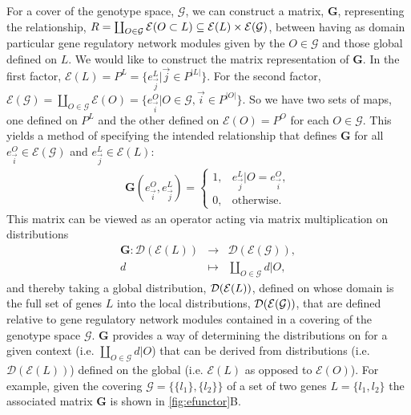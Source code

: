 For a cover of the genotype space, $\mathcal{G}$, we can construct a matrix, $\mathbf{G}$, representing the relationship, $R = \coprod_{O \in \mathcal{G}} \mathcal{E}(O \subset L) \subseteq \mathcal{E}(L) \times \mathcal{E} (\mathcal{G})$, between \gnpm{} having as domain particular gene regulatory network modules given by the $O \in \mathcal{G}$ and those global \gnpm{} defined on $L$. We would like to construct the matrix representation of $\mathbf{G}$. In the first factor, $\mathcal{E}(L) = P^L = \{e^{L}_{\vec{j}} | \vec{j} \in P^{|L|}\}$.
For the second factor, $ \mathcal{E}(\mathcal{G}) = \coprod_{O \in \mathcal{G}} \mathcal{E}(O) = \{e^O_{\vec{i}} | O \in \mathcal{G}, \vec{i} \in P^{|O|} \}$.
 So we have two sets of maps, one defined on $P^L$ and the other defined on $\mathcal{E}(O) = P^O$ for each $O \in \mathcal{G}$. This yields a method of specifying the intended relationship that defines $\mathbf{G}$ for all $e^O_{\vec{i}} \in \mathcal{E}(\mathcal{G})$ and $e^{L}_{\vec{j}} \in \mathcal{E}(L)$:
\begin{eqnarray}\label{eq:margmat}
\mathbf{G}(e^O_{\vec{i}},e^L_{\vec{j}}) =
\begin{cases}
1, & e^L_{\vec{j}}|O = e^O_{\vec{i}},\\
0, & \text{otherwise}.
\end{cases}
\end{eqnarray}
This matrix can be viewed as an operator acting via matrix multiplication on distributions
\begin{eqnarray*}
\mathbf{G} \colon \mathcal{D}(\mathcal{E}(L)) &\rightarrow& \mathcal{D}( \mathcal{E}(\mathcal{G})),\\
d &\mapsto& \coprod_{O \in \mathcal{G}} d|O,
\end{eqnarray*}
and thereby taking a global distribution, $\mathcal{D} (\mathcal{E}(L))$, defined on \gnpm{} whose domain is the full set of genes $L$ into the local distributions, $\mathcal{D} (\mathcal{E}(\mathcal{G}))$, that are defined relative to gene regulatory network modules contained in a covering of the genotype space $\mathcal{G}$. $\mathbf{G}$ provides a way of determining the distributions on \gnpm{} for a given context (i.e. $\coprod_{O \in \mathcal{G}} d|O$) that can be derived from distributions (i.e. $\mathcal{D} ( \mathcal{E}(L) )$) defined on the global \gnpm{} (i.e. $\mathcal{E}(L)$ as opposed to $\mathcal{E}(O)$). For example, given the covering $\mathcal{G} = \{ \{l_1\}, \{l_2\} \}$ of a set of two genes $L = \{ l_1, l_2 \}$ the associated matrix $\mathbf{G}$ is shown in \ref{fig:efunctor}B.

